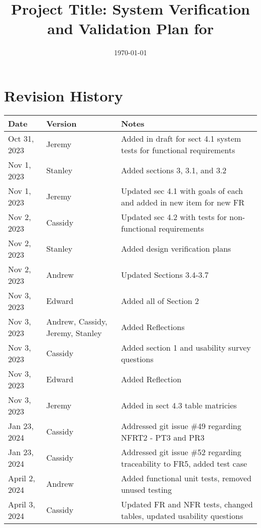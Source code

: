 \documentclass[12pt, titlepage]{article}
\begin{document}
\title{Project Title: System Verification and Validation Plan for \progname{}} 
\author{\authname}
\date{\today}
	
\maketitle


\section{Revision History}

\begin{tabularx}{\textwidth}{p{3cm}p{2cm}X}
\toprule {\bf Date} & {\bf Version} & {\bf Notes}\\
\midrule
Oct 31, 2023 & Jeremy & Added in draft for sect 4.1 system tests for functional requirements \\ 
Nov 1, 2023 & Stanley & Added sections 3, 3.1, and 3.2 \\
Nov 1, 2023 & Jeremy & Updated sec 4.1 with goals of each and added in new item for new FR \\
Nov 2, 2023 & Cassidy & Updated sec 4.2 with tests for non-functional requirements \\
Nov 2, 2023 & Stanley & Added design verification plans \\
Nov 2, 2023 & Andrew & Updated Sections 3.4-3.7\\
Nov 3, 2023 & Edward & Added all of Section 2\\
Nov 3, 2023 & Andrew, Cassidy, Jeremy, Stanley & Added Reflections\\
Nov 3, 2023 & Cassidy & Added section 1 and usability survey questions \\
Nov 3, 2023 & Edward & Added Reflection\\
Nov 3, 2023 & Jeremy & Added in sect 4.3 table matricies\\
Jan 23, 2024 & Cassidy & Addressed git issue \#49 regarding NFRT2 - PT3 and PR3 \\
Jan 23, 2024 & Cassidy & Addressed git issue \#52 regarding traceability to FR5, added test case \\
April 2, 2024 & Andrew & Added functional unit tests, removed unused testing \\
April 3, 2024 & Cassidy & Updated FR and NFR tests, changed tables, updated usability questions \\
\bottomrule
\end{tabularx}
\end{document}
